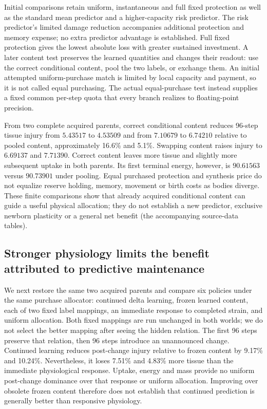 Initial comparisons retain uniform, instantaneous and full fixed protection as well as the standard mean predictor and a higher-capacity risk predictor. The risk predictor's limited damage reduction accompanies additional protection and memory expense; no extra predictor advantage is established. Full fixed protection gives the lowest absolute loss with greater sustained investment. A later content test preserves the learned quantities and changes their readout: use the correct conditional content, pool the two labels, or exchange them. An initial attempted uniform-purchase match is limited by local capacity and payment, so it is not called equal purchasing. The actual equal-purchase test instead supplies a fixed common per-step quota that every branch realizes to floating-point precision.

From two complete acquired parents, correct conditional content reduces 96-step tissue injury from $5.43517$ to $4.53509$ and from $7.10679$ to $6.74210$ relative to pooled content, approximately 16.6\% and 5.1\%. Swapping content raises injury to $6.69137$ and $7.71390$. Correct content leaves more tissue and slightly more subsequent uptake in both parents. Its first terminal energy, however, is $90.61563$ versus $90.73901$ under pooling. Equal purchased protection and synthesis price do not equalize reserve holding, memory, movement or birth costs as bodies diverge. These finite comparisons show that already acquired conditional content can guide a useful physical allocation; they do not establish a new predictor, exclusive newborn plasticity or a general net benefit (the accompanying source-data tables).

\subsection*{Stronger physiology limits the benefit attributed to predictive maintenance}

We next restore the same two acquired parents and compare six policies under the same purchase allocator: continued delta learning, frozen learned content, each of two fixed label mappings, an immediate response to completed strain, and uniform allocation. Both fixed mappings are run unchanged in both worlds; we do not select the better mapping after seeing the hidden relation. The first 96 steps preserve that relation, then 96 steps introduce an unannounced change. Continued learning reduces post-change injury relative to frozen content by 9.17\% and 10.24\%. Nevertheless, it loses 7.51\% and 4.83\% more tissue than the immediate physiological response. Uptake, energy and mass provide no uniform post-change dominance over that response or uniform allocation. Improving over obsolete frozen content therefore does not establish that continued prediction is generally better than responsive physiology.

